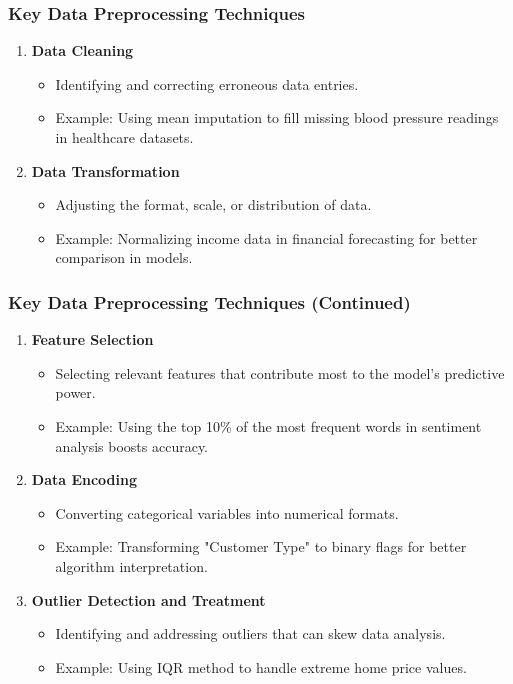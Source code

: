 \documentclass{beamer}
\begin{document}
\begin{frame}[fragile]
    \frametitle{Key Data Preprocessing Techniques}
    \begin{enumerate}
        \item \textbf{Data Cleaning}
        \begin{itemize}
            \item Identifying and correcting erroneous data entries.
            \item Example: Using mean imputation to fill missing blood pressure readings in healthcare datasets.
        \end{itemize}

        \item \textbf{Data Transformation}
        \begin{itemize}
            \item Adjusting the format, scale, or distribution of data.
            \item Example: Normalizing income data in financial forecasting for better comparison in models.
        \end{itemize}
    \end{enumerate}
\end{frame}

\begin{frame}[fragile]
    \frametitle{Key Data Preprocessing Techniques (Continued)}
    \begin{enumerate}[resume]
        \item \textbf{Feature Selection}
        \begin{itemize}
            \item Selecting relevant features that contribute most to the model's predictive power.
            \item Example: Using the top 10\% of the most frequent words in sentiment analysis boosts accuracy.
        \end{itemize}

        \item \textbf{Data Encoding}
        \begin{itemize}
            \item Converting categorical variables into numerical formats.
            \item Example: Transforming "Customer Type" to binary flags for better algorithm interpretation.
        \end{itemize}

        \item \textbf{Outlier Detection and Treatment}
        \begin{itemize}
            \item Identifying and addressing outliers that can skew data analysis.
            \item Example: Using IQR method to handle extreme home price values.
        \end{itemize}
    \end{enumerate}
\end{frame}
\end{document}
